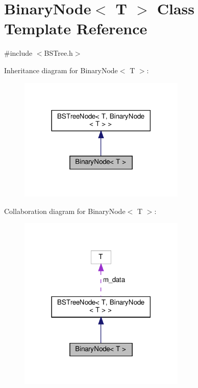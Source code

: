 \hypertarget{classBinaryNode}{}\section{Binary\+Node$<$ T $>$ Class Template Reference}
\label{classBinaryNode}


{\ttfamily \#include $<$B\+S\+Tree.\+h$>$}



Inheritance diagram for Binary\+Node$<$ T $>$\+:\nopagebreak
\begin{figure}[H]
\begin{center}
\leavevmode
\includegraphics[width=225pt]{classBinaryNode__inherit__graph}
\end{center}
\end{figure}


Collaboration diagram for Binary\+Node$<$ T $>$\+:\nopagebreak
\begin{figure}[H]
\begin{center}
\leavevmode
\includegraphics[width=225pt]{classBinaryNode__coll__graph}
\end{center}
\end{figure}

